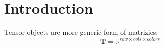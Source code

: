 \section{Introduction}
Tensor objects are more generic form of matrizies:
\[
\mathbf{T} = \mathbb{R}^{row \times cols \times colors}
\]
